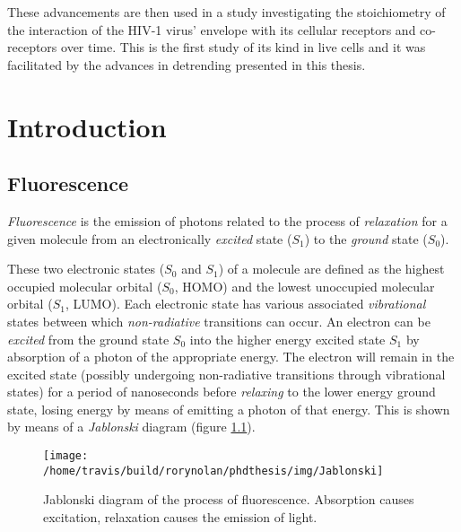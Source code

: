 \documentclass[12pt,]{book}
\theoremstyle{definition}
\theoremstyle{definition}
\theoremstyle{definition}
\theoremstyle{remark}
\let\BeginKnitrBlock\begin \let\EndKnitrBlock\end
\begin{document}
These advancements are then used in a study investigating the
stoichiometry of the interaction of the HIV-1 virus' envelope with its
cellular receptors and co-receptors over time. This is the first study
of its kind in live cells and it was facilitated by the advances in
detrending presented in this thesis.

\chapter{Introduction}\label{intro}

\section{Fluorescence}\label{fluorescence}

\BeginKnitrBlock{definition}
\protect\hypertarget{def:unnamed-chunk-1}{}{\label{def:unnamed-chunk-1}
}\emph{Fluorescence} is the emission of photons related to the process
of \emph{relaxation} for a given molecule from an electronically
\emph{excited} state (\(S_1\)) to the \emph{ground} state (\(S_0\)).
\EndKnitrBlock{definition}

These two electronic states (\(S_0\) and \(S_1\)) of a molecule are
defined as the highest occupied molecular orbital (\(S_0\), HOMO) and
the lowest unoccupied molecular orbital (\(S_1\), LUMO). Each electronic
state has various associated \emph{vibrational} states between which
\emph{non-radiative} transitions can occur. An electron can be
\emph{excited} from the ground state \(S_0\) into the higher energy
excited state \(S_1\) by absorption of a photon of the appropriate
energy. The electron will remain in the excited state (possibly
undergoing non-radiative transitions through vibrational states) for a
period of nanoseconds before \emph{relaxing} to the lower energy ground
state, losing energy by means of emitting a photon of that energy. This
is shown by means of a \emph{Jablonski} diagram (figure
\ref{fig:Jablonski}).





\begin{figure}

\texttt{[image: /home/travis/build/rorynolan/phdthesis/img/Jablonski]} \hfill{}

\caption{Jablonski diagram of the process of
fluorescence. Absorption causes excitation, relaxation causes the
emission of light.}\label{fig:Jablonski}
\end{figure}
\end{document}
